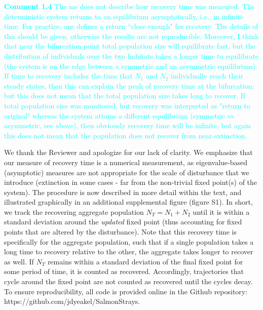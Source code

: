 \documentclass[ucm,12pt]{ucletter}
\begin{document}
\begin{letter}
\noindent \textcolor{cyan}{
{\bf Comment 1.4} The ms does not describe how recovery time was measured. The deterministic system returns to an equilibrium asymptotically, i.e., in infinite time. For practice, one defines a return ``close enough" for recovery. The details of this should be given, otherwise the results are not reproducible. Moreover, I think that near the bifurcation point total population size will equilibrate fast, but the distribution of individuals over the two habitats takes a longer time to equilibrate (the system is on the edge between a symmetric and an asymmetric equilibrium). If time to recovery includes the time that $N_1$ and $N_2$ individually reach their steady states, then this can explain the peak of recovery time at the bifurcation; but this does not mean that the total population size takes long to recover. If total population size was monitored, but recovery was interpreted as "return to original" whereas the system attains a different equilibrium (symmetric vs asymmetric, see above), then obviously recovery time will be infinite, but again this does not mean that the population does not recover from near extinction.
}

 We thank the Reviewer and apologize for our lack of clarity. We emphasize that our measure of recovery time is a numerical measurement, as eigenvalue-based (asymptotic) measures are not appropriate for the scale of disturbance that we introduce (extinction in some cases - far from the non-trivial fixed point(s) of the system). The procedure is now described in more detail within the text, and illustrated graphically in an additional supplemental figure (figure S1). In short, we track the recovering aggregate population $N_T=N_1+N_2$ until it is within a standard deviation around the \emph{updated} fixed point (thus accounting for fixed points that are altered by the disturbance). Note that this recovery time is specifically for the aggregate population, such that if a single population takes a long time to recovery relative to the other, the aggregate takes longer to recover as well. If $N_T$ remains within a standard deviation of the final fixed point for some period of time, it is counted as recovered. Accordingly, trajectories that cycle around the fixed point are not counted as recovered until the cycles decay. To ensure reproducibility, all code is provided online in the Github repository: https://github.com/jdyeakel/SalmonStrays.


\end{letter}
\end{document}
